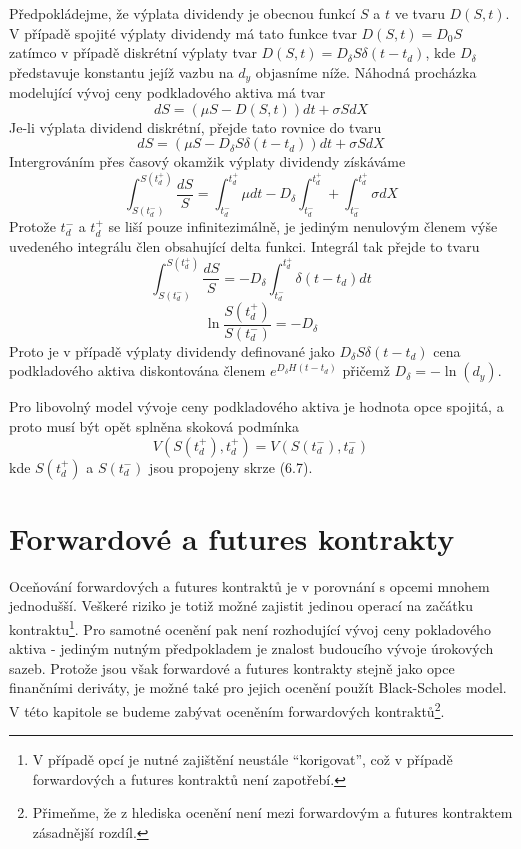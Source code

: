 \documentclass[a4paper]{book}
\begin{document}
Předpokládejme, že výplata dividendy je obecnou funkcí $S$ a $t$ ve tvaru $D(S,t)$. V případě spojité výplaty dividendy má tato funkce tvar $D(S,t) = D_0S$ zatímco v případě diskrétní výplaty tvar $D(S,t) = D_{\delta}S \delta(t - t_d)$, kde $D_{\delta}$ představuje konstantu jejíž vazbu na $d_y$ objasníme níže. Náhodná procházka modelující vývoj ceny podkladového aktiva má tvar
\begin{equation*}
dS = (\mu S - D(S,t))dt + \sigma S dX
\end{equation*}
Je-li výplata dividend diskrétní, přejde tato rovnice do tvaru
\begin{equation*}
dS = (\mu S - D_{\delta}S \delta(t - t_d))dt + \sigma S dX
\end{equation*}
Intergrováním přes časový okamžik výplaty dividendy získáváme
\begin{equation*}
\int_{S(t_d^-)}^{S(t_d^+)} \frac{dS}{S} = \int_{t_d^-}^{t_d^+}\mu dt - D_{\delta}\int_{t_d^-}^{t_d^+} + \int_{t_d^-}^{t_d^+}\sigma dX
\end{equation*}
Protože $t_d^-$ a $t_d^+$ se liší pouze infinitezimálně, je jediným nenulovým členem výše uvedeného integrálu člen obsahující delta funkci. Integrál tak přejde to tvaru
\begin{equation*}
\int_{S(t_d^-)}^{S(t_d^+)} \frac{dS}{S} = -D_{\delta} \int_{t_d^-}^{t_d^+}\delta(t - t_d)dt
\end{equation*}
\begin{equation}
\ln \frac{S(t_d^+)}{S(t_d^-)} = -D_{\delta}
\end{equation}
Proto je v případě výplaty dividendy definované jako $D_{\delta}S \delta (t - t_d)$ cena podkladového aktiva diskontována členem $e^{D_{\delta}H(t - t_d)}$ přičemž $D_{\delta} = -\ln(d_y)$.

Pro libovolný model vývoje ceny podkladového aktiva je hodnota opce spojitá, a proto musí být opět splněna skoková podmínka
\begin{equation*}
V(S(t_d^+), t_d^+) = V(S(t_d^-), t_d^-)
\end{equation*}
 kde $S(t_d^+)$ a $S(t_d^-)$ jsou propojeny skrze (6.7).

\section{Forwardové a futures kontrakty}

Oceňování forwardových a futures kontraktů je v porovnání s opcemi mnohem jednodušší. Veškeré riziko je totiž možné zajistit jedinou operací na začátku kontraktu\footnote{V případě opcí je nutné zajištění neustále ``korigovat'', což v případě forwardových a futures kontraktů není zapotřebí.}. Pro samotné ocenění pak není rozhodující vývoj ceny pokladového aktiva - jediným nutným předpokladem je znalost budoucího vývoje úrokových sazeb. Protože jsou však forwardové a futures kontrakty stejně jako opce finančními deriváty, je možné také pro jejich ocenění použít Black-Scholes model. V této kapitole se budeme zabývat oceněním forwardových kontraktů\footnote{Přimeňme, že z hlediska ocenění není mezi forwardovým a futures kontraktem zásadnější rozdíl.}.
\end{document}

